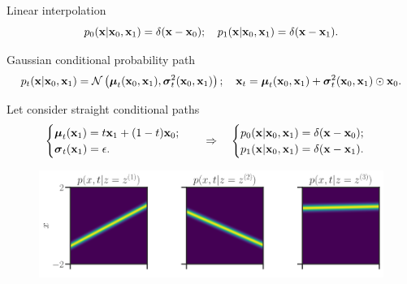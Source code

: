 \begin{frame}{Linear interpolation}
	\[
		p_0(\mathbf{x} | \mathbf{x}_0, \mathbf{x}_1) = \delta(\mathbf{x} - \mathbf{x}_0); \quad p_1(\mathbf{x} | \mathbf{x}_0, \mathbf{x}_1) = \delta(\mathbf{x} - \mathbf{x}_1).
	\]
	
	\begin{block}{Gaussian conditional probability path}
		\vspace{-0.5cm}
		{\small
		\[
			p_t(\mathbf{x} | \mathbf{x}_0, \mathbf{x}_1) = \mathcal{N}\left(\boldsymbol{\mu}_t(\mathbf{x}_0, \mathbf{x}_1), \boldsymbol{\sigma}_t^2(\mathbf{x}_0, \mathbf{x}_1)\right); \quad \mathbf{x}_t = \boldsymbol{\mu}_t(\mathbf{x}_0, \mathbf{x}_1) +  \boldsymbol{\sigma}_t^2(\mathbf{x}_0, \mathbf{x}_1) \odot \mathbf{x}_0.
		\]
		}
		\vspace{-0.6cm}
	\end{block}
	Let consider straight conditional paths	
	\[
		\begin{cases}
			\boldsymbol{\mu}_t(\mathbf{x}_1) = t \mathbf{x}_1 + (1 - t) \mathbf{x}_0; \\
			\boldsymbol{\sigma}_t(\mathbf{x}_1) = \epsilon.
		\end{cases}
		\quad \Rightarrow \quad 
		\begin{cases}
			p_0(\mathbf{x} | \mathbf{x}_0, \mathbf{x}_1) = \delta(\mathbf{x} - \mathbf{x}_0); \\
			p_1(\mathbf{x} | \mathbf{x}_0, \mathbf{x}_1) = \delta(\mathbf{x} - \mathbf{x}_1).
		\end{cases}
	\]
	\vspace{-0.3cm}
	\begin{figure}
		\centering
		\includegraphics[width=\linewidth]{figs/linear_paths}
	\end{figure}
\end{frame}
